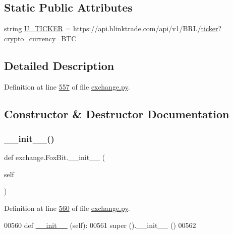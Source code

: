 \subsection*{Static Public Attributes}
\begin{DoxyCompactItemize}
\item 
string \hyperlink{classexchange_1_1_fox_bit_a7ba3f64a2b55479da2239393c6140ec8}{U\+\_\+\+T\+I\+C\+K\+ER} = \textquotesingle{}https\+://api.\+blinktrade.\+com/api/v1/B\+RL/\hyperlink{classexchange_1_1_exchange_a7cf9e52f993627955a2e242c388daaeb}{ticker}?crypto\+\_\+currency=B\+TC\textquotesingle{}
\end{DoxyCompactItemize}


\subsection{Detailed Description}


Definition at line \hyperlink{exchange_8py_source_l00557}{557} of file \hyperlink{exchange_8py_source}{exchange.\+py}.



\subsection{Constructor \& Destructor Documentation}
\mbox{\label{classexchange_1_1_fox_bit_a1f892137668748287116d902ef668d1a}} 
\subsubsection{\texorpdfstring{\+\_\+\+\_\+init\+\_\+\+\_\+()}{\_\_init\_\_()}}
{\footnotesize\ttfamily def exchange.\+Fox\+Bit.\+\_\+\+\_\+init\+\_\+\+\_\+ (\begin{DoxyParamCaption}\item[{}]{self }\end{DoxyParamCaption})}



Definition at line \hyperlink{exchange_8py_source_l00560}{560} of file \hyperlink{exchange_8py_source}{exchange.\+py}.


\begin{DoxyCode}
00560     \textcolor{keyword}{def }\hyperlink{namespacestart__time_a9c9bd378729a13c96a22c8b079ea172c}{\_\_init\_\_} (self):
00561         super ().\_\_init\_\_ ()
00562         
\end{DoxyCode}



